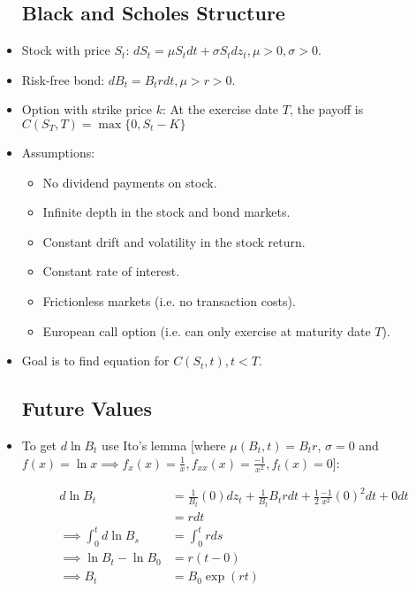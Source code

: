 \documentclass{article}
\begin{document}
\begin{itemize}
\subsection*{Black and Scholes Structure}

\item Stock with price $S_t$: $dS_t = \mu S_t dt + \sigma S_t dz_t, \mu > 0, \sigma > 0$.

\item Risk-free bond: $dB_t = B_trdt, \mu > r > 0$.

\item Option with strike price $k$: At the exercise date $T$, the payoff is $C(S_T, T) = \max\{0, S_t - K\}$

\item Assumptions:

\begin{itemize}

\item No dividend payments on stock.
\item Infinite depth in the stock and bond markets.
\item Constant drift and volatility in the stock return.
\item Constant rate of interest.
\item Frictionless markets (i.e. no transaction costs).
\item European call option (i.e. can only exercise at maturity date $T$).

\end{itemize}

\item Goal is to find equation for $C(S_t, t), t < T$.

\pagebreak

\subsection*{Future Values}

\item To get $d \ln B_t$ use Ito's lemma [where $\mu(B_t, t) = B_t r$, $\sigma = 0$ and $f(x) = \ln x \implies f_x(x) = \frac{1}{x}, f_{xx}(x) = \frac{-1}{x^2}, f_t(x) = 0$]:

\begin{align*}
d\ln B_t &= \frac{1}{B_t} (0) dz_t + \frac{1}{B_t} B_t r dt + \frac{1}{2} \frac{-1}{x^2}(0)^2 dt + 0 dt \\
&= r dt\\
\implies
\int_0^t d \ln B_s &= \int_0^t r ds \\
\implies
 \ln B_t - \ln B_0 &= r (t - 0) \\
\implies
  B_t &= B_0 \exp (rt)
\end{align*}


\end{itemize}
\end{document}
